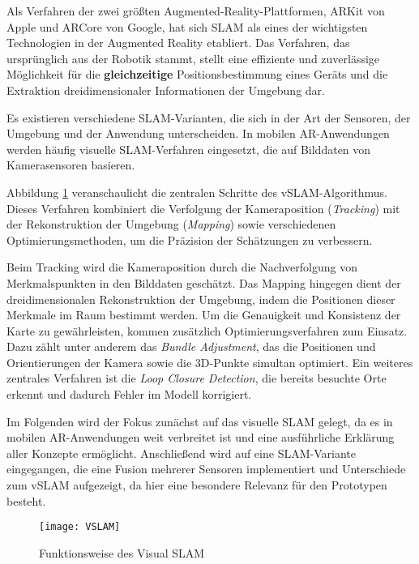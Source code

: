 Als Verfahren der zwei größten Augmented-Reality-Plattformen, ARKit von Apple und ARCore von Google, hat sich SLAM als eines der wichtigsten Technologien in der Augmented Reality etabliert. Das Verfahren, das ursprünglich aus der Robotik stammt, stellt eine effiziente und zuverlässige Möglichkeit für die \textbf{gleichzeitige} Positionsbestimmung  eines Geräts und die Extraktion dreidimensionaler Informationen der Umgebung dar. \cite{appledevdoc,arcoredevdoc, doerner2022virtual}

Es existieren verschiedene SLAM-Varianten, die sich in der Art der Sensoren, der Umgebung und der Anwendung unterscheiden. In mobilen AR-Anwendungen werden häufig visuelle SLAM-Verfahren eingesetzt, die auf Bilddaten von Kamerasensoren basieren. \cite{tourani2022vSLAMTrends}

Abbildung \ref{fig:VSLAM} veranschaulicht die zentralen Schritte des vSLAM-Algorithmus. Dieses Verfahren kombiniert die Verfolgung der Kameraposition (\emph{Tracking}) mit der Rekonstruktion der Umgebung (\emph{Mapping}) sowie verschiedenen Optimierungsmethoden, um die Präzision der Schätzungen zu verbessern. \cite{gao2021vSLAM, tourani2022vSLAMTrends}

Beim Tracking wird die Kameraposition durch die Nachverfolgung von Merkmalspunkten in den Bilddaten geschätzt. Das Mapping hingegen dient der dreidimensionalen Rekonstruktion der Umgebung, indem die Positionen dieser Merkmale im Raum bestimmt werden. Um die Genauigkeit und Konsistenz der Karte zu gewährleisten, kommen zusätzlich Optimierungsverfahren zum Einsatz. Dazu zählt unter anderem das \emph{Bundle Adjustment}, das die Positionen und Orientierungen der Kamera sowie die 3D-Punkte simultan optimiert. Ein weiteres zentrales Verfahren ist die \emph{Loop Closure Detection}, die bereits besuchte Orte erkennt und dadurch Fehler im Modell korrigiert. \cite{gao2021vSLAM, tourani2022vSLAMTrends}

Im Folgenden wird der Fokus zunächst auf das visuelle SLAM gelegt, da es in mobilen AR-Anwendungen weit verbreitet ist und eine ausführliche Erklärung aller Konzepte ermöglicht. Anschließend wird auf eine SLAM-Variante eingegangen, die eine Fusion mehrerer Sensoren implementiert und Unterschiede zum vSLAM aufgezeigt, da hier eine besondere Relevanz für den Prototypen besteht. \cite{gao2021vSLAM, tourani2022vSLAMTrends, doerner2022virtual}

\begin{figure}
    \centering
    \texttt{[image: VSLAM]}
    \caption{Funktionsweise des Visual SLAM \cite{tourani2022vSLAMTrends}\label{fig:VSLAM}}\par
\end{figure}

